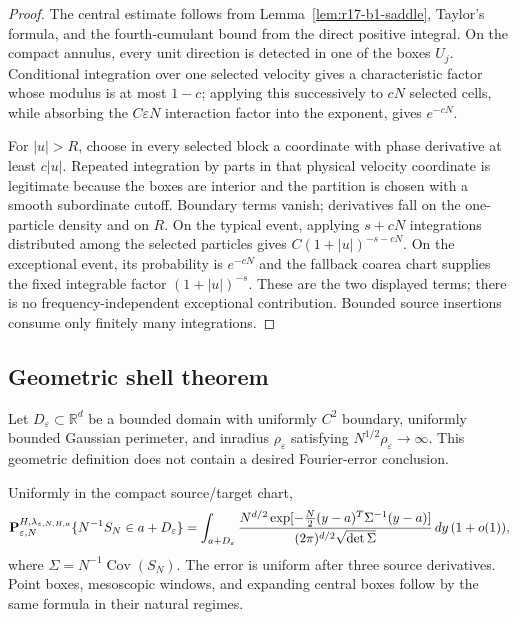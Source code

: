 \begin{proof}
The central estimate follows from Lemma~\ref{lem:r17-b1-saddle}, Taylor's
formula, and the fourth-cumulant bound from the direct positive integral.  On
the compact annulus, every unit direction is detected in one of the boxes
$U_j$.  Conditional integration over one selected velocity gives a
characteristic factor whose modulus is at most $1-c$; applying this successively
to $cN$ selected cells, while absorbing the $C\varepsilon N$ interaction
factor into the exponent, gives $e^{-cN}$.

For $|u|>R$, choose in every selected block a coordinate with phase derivative
at least $c|u|$.  Repeated integration by parts in that physical velocity
coordinate is legitimate because the boxes are interior and the partition is
chosen with a smooth subordinate cutoff.  Boundary terms vanish; derivatives
fall on the one-particle density and on $R$.  On the typical event, applying
$s+cN$ integrations distributed among the selected particles gives
$C(1+|u|)^{-s-cN}$.  On the exceptional event, its probability is
$e^{-cN}$ and the fallback coarea chart supplies the fixed integrable factor
$(1+|u|)^{-s}$.  These are the two displayed terms; there is no
frequency-independent exceptional contribution.  Bounded source insertions
consume only finitely many integrations.
\end{proof}

\subsection{Geometric shell theorem}

Let $D_\varepsilon\subset\mathbb R^d$ be a bounded domain with uniformly
$C^2$ boundary, uniformly bounded Gaussian perimeter, and inradius
$\rho_\varepsilon$ satisfying
$N^{1/2}\rho_\varepsilon\to\infty$.  This geometric definition does not
contain a desired Fourier-error conclusion.

\begin{theorem}
\label{thm:r17-b1-coefficient}
Uniformly in the compact source/target chart,
\[
 \mathbf P_{\varepsilon,N}^{H,\lambda_{\varepsilon,N,H,a}}
 \{N^{-1}S_N\in a+D_\varepsilon\}
 =\int_{a+D_\varepsilon}
 {N^{d/2}\exp[-\frac N2(y-a)^T\Sigma^{-1}(y-a)]
  \over(2\pi)^{d/2}\sqrt{\det\Sigma}}\,dy\,(1+o(1)),
\]
where $\Sigma=N^{-1}\operatorname{Cov}(S_N)$.  The error is uniform after
three source derivatives.  Point boxes, mesoscopic windows, and expanding
central boxes follow by the same formula in their natural regimes.
\end{theorem}

